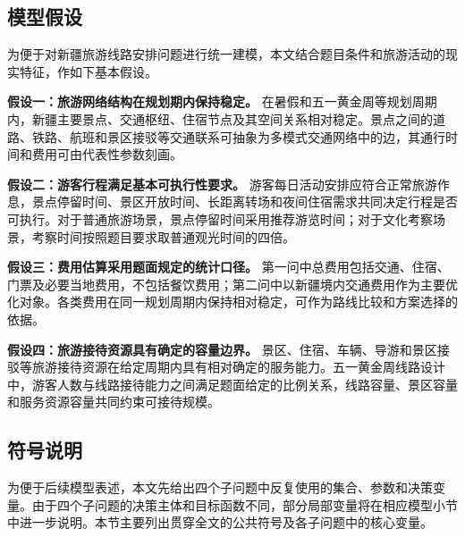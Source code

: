 \documentclass[UTF8,zihao=-4,a4paper]{ctexart}
\begin{document}
\subsection{模型假设}
\label{subsec:model_assumptions}

为便于对新疆旅游线路安排问题进行统一建模，本文结合题目条件和旅游活动的现实特征，作如下基本假设。

\textbf{假设一：旅游网络结构在规划期内保持稳定。}
在暑假和五一黄金周等规划周期内，新疆主要景点、交通枢纽、住宿节点及其空间关系相对稳定。景点之间的道路、铁路、航班和景区接驳等交通联系可抽象为多模式交通网络中的边，其通行时间和费用可由代表性参数刻画。

\textbf{假设二：游客行程满足基本可执行性要求。}
游客每日活动安排应符合正常旅游作息，景点停留时间、景区开放时间、长距离转场和夜间住宿需求共同决定行程是否可执行。对于普通旅游场景，景点停留时间采用推荐游览时间；对于文化考察场景，考察时间按照题目要求取普通观光时间的四倍。

\textbf{假设三：费用估算采用题面规定的统计口径。}
第一问中总费用包括交通、住宿、门票及必要当地费用，不包括餐饮费用；第二问中以新疆境内交通费用作为主要优化对象。各类费用在同一规划周期内保持相对稳定，可作为路线比较和方案选择的依据。

\textbf{假设四：旅游接待资源具有确定的容量边界。}
景区、住宿、车辆、导游和景区接驳等旅游接待资源在给定周期内具有相对确定的服务能力。五一黄金周线路设计中，游客人数与线路接待能力之间满足题面给定的比例关系，线路容量、景区容量和服务资源容量共同约束可接待规模。

\subsection{符号说明}
\label{subsec:notation}

为便于后续模型表述，本文先给出四个子问题中反复使用的集合、参数和决策变量。由于四个子问题的决策主体和目标函数不同，部分局部变量将在相应模型小节中进一步说明。本节主要列出贯穿全文的公共符号及各子问题中的核心变量。
\end{document}
